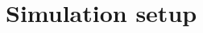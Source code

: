 \documentclass[a4paper,10pt]{report}
\begin{document}
\section{\textbf{Simulation setup}}
\end{document}
